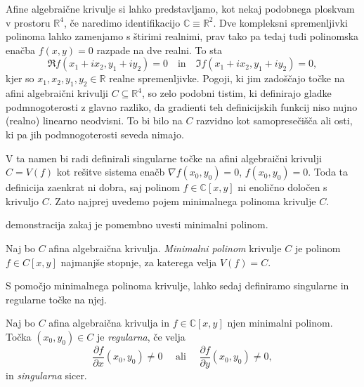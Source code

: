 \documentclass[mat1]{fmfdelo}
\newcommand{\R}{\mathbb R}
\newcommand{\C}{\mathbb C}
\begin{document}
Afine algebraične krivulje si lahko predstavljamo, kot nekaj podobnega ploskvam v prostoru $\R^4$, če naredimo identifikacijo $\C \equiv \R^2$. Dve kompleksni spremenljivki polinoma lahko zamenjamo s štirimi realnimi, prav tako pa tedaj tudi polinomska enačba $f(x,y) = 0$ razpade na dve realni. To sta
\begin{equation*}
    \Re f(x_1 + ix_2, y_1 + iy_2) = 0 \quad \text{in} \quad \Im f(x_1 + ix_2, y_1 + iy_2) = 0,
\end{equation*}
kjer so $x_1, x_2, y_1, y_2 \in \R$ realne spremenljivke.
Pogoji, ki jim zadoščajo točke na afini algebraični krivulji $C \subseteq \R^4$, so zelo podobni tistim, ki definirajo gladke pod\-mnogoterosti z glavno razliko, da gradienti teh definicijskih funkcij niso nujno (realno) linearno neodvisni. To bi bilo na $C$ razvidno kot samopresečišča ali osti, ki pa jih podmnogoterosti seveda nimajo. 
\par
V ta namen bi radi definirali singularne točke na afini algebraični krivulji $C = V(f)$ kot rešitve sistema enačb $\nabla f(x_0, y_0) = 0$, $f(x_0, y_0) = 0$. Toda ta definicija zaenkrat ni dobra, saj polinom $f \in \C[x,y]$ ni enolično določen s krivuljo $C$. Zato najprej uvedemo pojem minimalnega polinoma krivulje $C$.

\begin{primer}
   demonstracija zakaj je pomembno uvesti minimalni polinom.
\end{primer}

\begin{definicija}
Naj bo $C$ afina algebraična krivulja. \emph{Minimalni polinom} krivulje $C$ je polinom $f \in C[x,y]$ najmanjše stopnje, za katerega velja $V(f) = C$.
\end{definicija}

S pomočjo minimalnega polinoma krivulje, lahko sedaj definiramo singularne in regularne točke na njej.

\begin{definicija}
    Naj bo $C$ afina algebraična krivulja in $f \in \C[x,y]$ njen minimalni polinom. Točka $(x_0, y_0) \in C$ je \emph{regularna}, če velja
    $$\frac{\partial f}{\partial x}(x_0, y_0) \neq 0 \quad \text{ ali } \quad \frac{\partial f}{\partial y}(x_0, y_0) \neq 0,$$ 
    in \emph{singularna} sicer.
\end{definicija}
\end{document}
